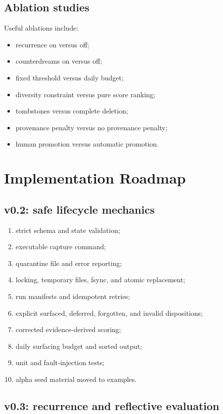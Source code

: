 \documentclass[11pt,a4paper]{article}
\begin{document}
\subsection{Ablation studies}

Useful ablations include:

\begin{itemize}
  \item recurrence on versus off;
  \item counterdreams on versus off;
  \item fixed threshold versus daily budget;
  \item diversity constraint versus pure score ranking;
  \item tombstones versus complete deletion;
  \item provenance penalty versus no provenance penalty;
  \item human promotion versus automatic promotion.
\end{itemize}

\section{Implementation Roadmap}

\subsection{v0.2: safe lifecycle mechanics}

\begin{enumerate}
  \item strict schema and state validation;
  \item executable capture command;
  \item quarantine file and error reporting;
  \item locking, temporary files, fsync, and atomic replacement;
  \item run manifests and idempotent retries;
  \item explicit surfaced, deferred, forgotten, and invalid dispositions;
  \item corrected evidence-derived scoring;
  \item daily surfacing budget and sorted output;
  \item unit and fault-injection tests;
  \item alpha seed material moved to examples.
\end{enumerate}

\subsection{v0.3: recurrence and reflective evaluation}
\end{document}
